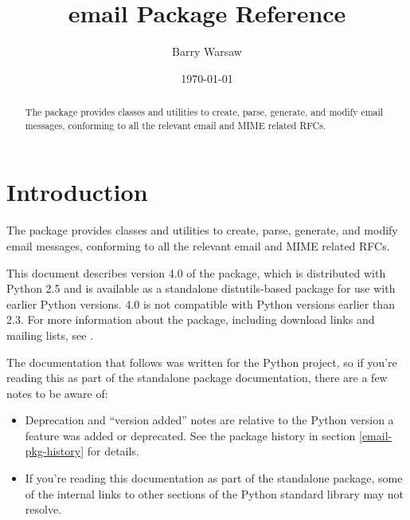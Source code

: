 \documentclass{howto}
\title{email Package Reference}
\author{Barry Warsaw}
\date{\today}
\begin{document}
\maketitle

\begin{abstract}
  The  package provides classes and utilities to create,
  parse, generate, and modify email messages, conforming to all the
  relevant email and MIME related RFCs.
\end{abstract}

%
\tableofcontents

\section{Introduction}
The  package provides classes and utilities to create,
parse, generate, and modify email messages, conforming to all the
relevant email and MIME related RFCs.

This document describes version 4.0 of the  package, which is
distributed with Python 2.5 and is available as a standalone distutils-based
package for use with earlier Python versions.   4.0 is not
compatible with Python versions earlier than 2.3.  For more information about
the  package, including download links and mailing lists, see
.

The documentation that follows was written for the Python project, so
if you're reading this as part of the standalone 
package documentation, there are a few notes to be aware of:

\begin{itemize}
\item Deprecation and ``version added'' notes are relative to the
      Python version a feature was added or deprecated.  See
      the package history in section \ref{email-pkg-history} for details.

\item If you're reading this documentation as part of the
      standalone  package, some of the internal links to
      other sections of the Python standard library may not resolve.

\end{itemize}


\end{document}
